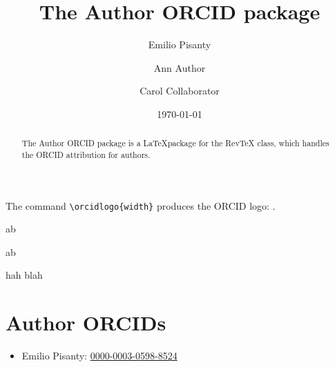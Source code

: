 \documentclass[%
  reprint,
  aps,
  pra,
  superscriptaddress,
  a4paper,
]{revtex4-2}
\newcommand{\orcidd}[1]{%
  \href{%
    https://orcid.org/#1%
  }{%
   \,\protect\texttt{[image: ORCID-icon.png]}\,%
  }%
}
\begin{document}
\title{The Author ORCID package}


\author{Emilio Pisanty}

\author{Ann Author}

\author{Carol Collaborator}


\date{\today}



\begin{abstract}
The Author ORCID package is a \LaTeX package for the RevTeX class, which handles the ORCID attribution for authors.
\end{abstract}

\maketitle





{\color{gray}
\lipsum[1]
}

The command \verb|\orcidlogo{width}| produces the ORCID logo: \orcidlogo{8pt}.




\setlength{\fboxsep}{0pt}

a\orcidlogo{8pt}b

a\fbox{\orcidlogo{8pt}}b

hah blah

























\section*{Author ORCIDs}
\vspace{-1mm}
\begin{itemize}[
  itemsep=-1mm,
  leftmargin=+\relax,
  label={}
  ]
\item Emilio Pisanty:
   \href{https://orcid.org/0000-0003-0598-8524}{0000-0003-0598-8524}
\end{itemize}



 

\end{document}
